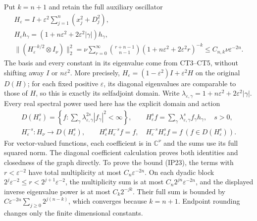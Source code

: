 \documentclass[
  11pt,
]{article}
\begin{document}
Put \(k=n+1\) and retain the full auxiliary oscillator \[
 \begin{gathered}
 H_\varepsilon=I+\varepsilon^2\sum_{j=1}^n(x_j^2+D_j^2),\\
 H_\varepsilon h_\gamma
   =(1+n\varepsilon^2+2\varepsilon^2|\gamma|)h_\gamma,\\
 \|(H_\varepsilon^{-k/2}\otimes I_\nu)\|_2^2
 =\nu\sum_{r=0}^\infty\binom{r+n-1}{n-1}
             (1+n\varepsilon^2+2\varepsilon^2r)^{-k}
 \leq C_{n,k}\nu\varepsilon^{-2n}.
 \end{gathered}                                                  \tag{IP23}
\] The basis and every constant in its eigenvalue come from CT3--CT5,
without shifting away \(I\) or \(n\varepsilon^2\). More precisely,
\(H_\varepsilon=(1-\varepsilon^2)I+\varepsilon^2H\) on the original
\(D(H)\); for each fixed positive \(\varepsilon\), its diagonal
eigenvalues are comparable to those of \(H\), so this is exactly its
selfadjoint domain. Write
\(\lambda_{\varepsilon,\gamma}=1+n\varepsilon^2+2\varepsilon^2|\gamma|\).
Every real spectral power used here has the explicit domain and action
\[
 \begin{gathered}
 D(H_\varepsilon^s)=\left\{f:\sum_\gamma
       \lambda_{\varepsilon,\gamma}^{2s}|f_\gamma|^2<\infty\right\},
 \qquad H_\varepsilon^sf=\sum_\gamma
                   \lambda_{\varepsilon,\gamma}^sf_\gamma h_\gamma,
 \quad s>0,\\
 H_\varepsilon^{-s}:H_\nu\longrightarrow D(H_\varepsilon^s),
 \qquad H_\varepsilon^sH_\varepsilon^{-s}f=f,\quad
 H_\varepsilon^{-s}H_\varepsilon^sf=f\ (f\in D(H_\varepsilon^s)).
 \end{gathered}                                                   \tag{IP23a}
\] For vector-valued functions, each coefficient is in \(\mathbb C^\nu\)
and the sums use its full squared norm. The diagonal coefficient
calculation proves both identities and closedness of the graph directly.
To prove the bound (IP23), the terms with \(r<\varepsilon^{-2}\) have
total multiplicity at most \(C_n\varepsilon^{-2n}\). On each dyadic
block \(2^j\varepsilon^{-2}\leq r<2^{j+1}\varepsilon^{-2}\), the
multiplicity sum is at most \(C_n2^{jn}\varepsilon^{-2n}\), and the
displayed inverse eigenvalue power is at most \(C_k2^{-jk}\). Their full
sum is bounded by \(C\varepsilon^{-2n}\sum_{j\geq0}2^{j(n-k)}\), which
converges because \(k=n+1\). Endpoint rounding changes only the finite
dimensional constants.
\end{document}
